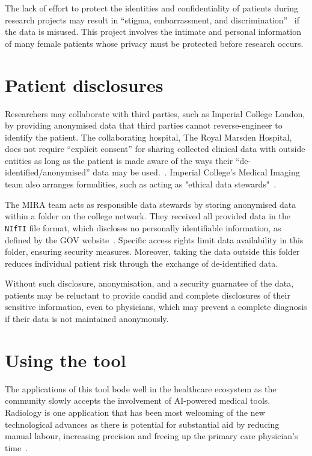 \documentclass[12pt,twoside]{report}
\begin{document}
The lack of effort to protect the identities and confidentiality of patients during research projects may result in ``stigma, embarrassment, and discrimination''~\cite{health-privacy} if the data is misused.
This project involves the intimate and personal information of many female patients whose privacy must be protected before research occurs.

\section{Patient disclosures}

Researchers may collaborate with third parties, such as Imperial College London, by providing anonymised data that third parties cannot reverse-engineer to identify the patient. The collaborating hospital, The Royal Marsden Hospital, does not require ``explicit consent'' for sharing collected clinical data with outside entities as long as the patient is made aware of the ways their ``de-identified/anonymised'' data may be used.~\cite{royal-marsden-privacy-note}. Imperial College's Medical Imaging team also arranges formalities, such as acting as "ethical data stewards"~\cite{Larson2020-ib}. 

The MIRA team acts as responsible data stewards by storing anonymised data within a folder on the college network. They received all provided data in the \texttt{NIfTI} file format, which discloses no personally identifiable information, as defined by the GOV website~\cite{gov-gdpr}. Specific access rights limit data availability in this folder, ensuring security measures. Moreover, taking the data outside this folder reduces individual patient risk through the exchange of de-identified data.

Without such disclosure, anonymisation, and a security guarnatee of the data, patients may be reluctant to provide candid and complete disclosures of their sensitive information, even to physicians, which may prevent a complete diagnosis if their data is not maintained anonymously.

\section{Using the tool}\label{sect:using-the-tool}

The applications of this tool bode well in the healthcare ecosystem as the community slowly accepts the involvement of AI-powered medical tools. Radiology is one application that has been most welcoming of the new technological advances as there is potential for substantial aid by reducing manual labour, increasing precision and freeing up the primary care physician's time~\cite{Amisha2019-ki}.
\end{document}
